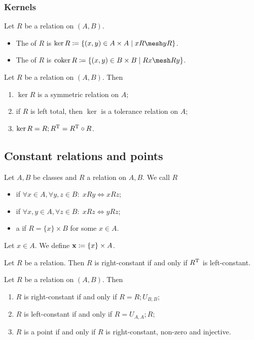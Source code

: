 \subsubsection{Kernels}

\begin{definition}
Let $R$ be a relation on $(A, B)$.
\begin{itemize}
\item The  of $R$ is $\ker R \defeq \setbuilder{(x,y)\in A\times A}{xR \mesh yR}$.
\item The  of $R$ is $\coker R \defeq \setbuilder{(x,y)\in B\times B}{Rx \mesh Ry}$.
\end{itemize}
\end{definition}

\begin{lemma}
Let $R$ be a relation on $(A, B)$. Then
\begin{enumerate}
\item $\ker R$ is a symmetric relation on $A$;
\item if $R$ is left total, then $\ker$ is a tolerance relation on $A$;
\item $\ker R = R;R^{\mathrm{T}} = R^{\mathrm{T}}\circ R$.
\end{enumerate}
\end{lemma}


\subsection{Constant relations and points}
\begin{definition}
Let $A,B$ be classes and $R$ a relation on $A,B$. We call $R$
\begin{itemize}
\item {} if $\forall x\in A, \forall y,z \in B: \; xRy \iff xRz$;
\item {} if $\forall x, y\in A, \forall z \in B: \; xRz \iff yRz$;
\item a  if $R = \{x\}\times B$ for some $x\in A$.
\end{itemize}
Let $x\in A$. We define $\point{x} \defeq \{x\}\times A$.
\end{definition}

\begin{lemma}
Let $R$ be a relation. Then $R$ is right-constant \textup{if and only if} $R^{\mathrm{T}}$ is left-constant.
\end{lemma}

\begin{lemma}
Let $R$ be a relation on $(A, B)$. Then
\begin{enumerate}
\item $R$ is right-constant \textup{if and only if} $R = R;U_{B,B}$;
\item $R$ is left-constant \textup{if and only if} $R = U_{A,A};R$;
\item $R$ is a point \textup{if and only if} $R$ is right-constant, non-zero and injective.
\end{enumerate}
\end{lemma}

